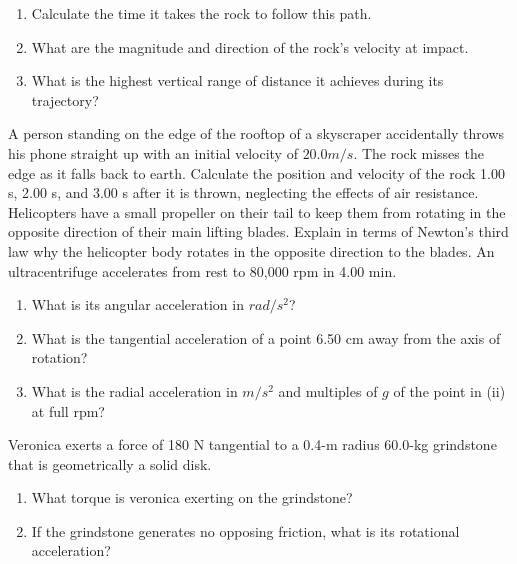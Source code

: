 \documentclass[12pt,addpoints]{exam}
\begin{document}
\begin{questions}
		\begin{enumerate}[label=(\roman*)]
			\item Calculate the time it takes the rock to follow this path.\vspace{1.5in}
			\item What are the magnitude and direction of the rock’s velocity at impact.\vspace{1.5in}
			\item What is the highest vertical range of distance it achieves during its trajectory?\vspace{1.5in}
		\end{enumerate} 
		\question A person standing on the edge of the rooftop of a skyscraper accidentally throws his phone straight up with an initial velocity of $20.0 m/s$. The rock misses the edge as it falls back to earth. Calculate the position and velocity of the rock 1.00 s, 2.00 s, and 3.00 s after it is thrown, neglecting the effects of air resistance.\vspace{2in}
		\question Helicopters have a small propeller on their tail to keep them from rotating in the opposite direction of their main lifting blades. Explain in terms of Newton’s third law why the helicopter body rotates in the opposite direction to the blades.\vspace{1.5in}
		\question An ultracentrifuge accelerates from rest to 80,000 rpm in 4.00 min.
		\begin{enumerate}[label=(\roman*)]
			\item What is its angular acceleration in $rad/s^2$?\vspace{1in}
			\item What is the tangential acceleration of a point 6.50 cm away from the axis of rotation?\vspace{1in}
			\item What is the radial acceleration in $m/s^2$ and multiples of $g$ of the point in (ii) at full rpm?\vspace{1in}
		\end{enumerate}
		\question Veronica exerts a force of 180 N tangential to a 0.4-m radius 60.0-kg grindstone that is geometrically a solid disk.
		\begin{enumerate}[label=(\roman*)]
			\item What torque is veronica exerting on the grindstone?\vspace{1.5in}
			\item If the grindstone generates no opposing friction, what is its rotational acceleration?\vspace{1.5in}

\end{enumerate}
\end{questions}
\end{document}
